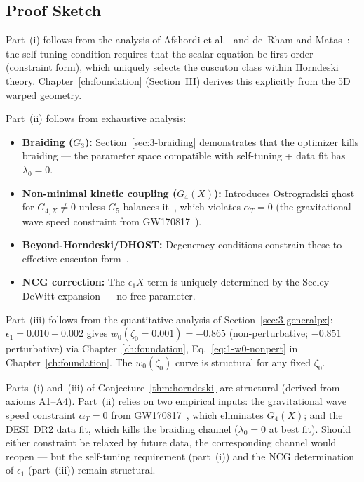 \subsection{Proof Sketch}
\label{sec:3-horndeski-proof}

Part~(i) follows from the analysis of Afshordi et al.~\cite{ch3:afshordi2007} and de~Rham and Matas~\cite{ch3:derham2016}: the self-tuning condition requires that the scalar equation be first-order (constraint form), which uniquely selects the cuscuton class within Horndeski theory. Chapter~\ref{ch:foundation} (Section~III) derives this explicitly from the 5D warped geometry.

Part~(ii) follows from exhaustive analysis:
\begin{itemize}
  \item \textbf{Braiding ($G_3$):} Section~\ref{sec:3-braiding} demonstrates that the optimizer kills braiding --- the parameter space compatible with self-tuning + data fit has $\lambda_0 = 0$.
  \item \textbf{Non-minimal kinetic coupling ($G_{4}(X)$):} Introduces Ostrogradski ghost for $G_{4,X} \neq 0$ unless $G_5$ balances it~\cite{ch3:gleyzes2015}, which violates $\alpha_T = 0$ (the gravitational wave speed constraint from GW170817~\cite{ch3:gw170817}).
  \item \textbf{Beyond-Horndeski/DHOST:} Degeneracy conditions constrain these to effective cuscuton form~\cite{ch3:langlois2016}.
  \item \textbf{NCG correction:} The $\epsilon_1 X$ term is uniquely determined by the Seeley--DeWitt expansion --- no free parameter.
\end{itemize}

Part~(iii) follows from the quantitative analysis of Section~\ref{sec:3-generalpx}: $\epsilon_1 = 0.010 \pm 0.002$ gives $w_0(\zeta_0{=}0.001) = -0.865$ (non-perturbative; $-0.851$ perturbative) via Chapter~\ref{ch:foundation}, Eq.~\eqref{eq:1-w0-nonpert} in Chapter~\ref{ch:foundation}. The $w_0(\zeta_0)$ curve is structural for any fixed $\zeta_0$.

\begin{remark}
Parts~(i) and~(iii) of Conjecture~\ref{thm:horndeski} are structural (derived from axioms A1--A4). Part~(ii) relies on two empirical inputs: the gravitational wave speed constraint $\alpha_T = 0$ from GW170817~\cite{ch3:gw170817}, which eliminates $G_{4}(X)$; and the DESI~DR2 data fit, which kills the braiding channel ($\lambda_0 = 0$ at best fit). Should either constraint be relaxed by future data, the corresponding channel would reopen --- but the self-tuning requirement (part~(i)) and the NCG determination of $\epsilon_1$ (part~(iii)) remain structural.
\end{remark}

